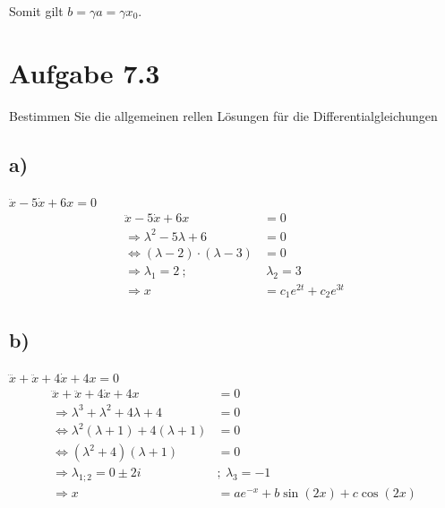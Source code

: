 \documentclass{theozettel}
\begin{document}
Somit gilt $b = \gamma a = \gamma x_0$.



\section*{Aufgabe 7.3} 
Bestimmen Sie die allgemeinen rellen Lösungen für die Differentialgleichungen
\subsection*{a)} $\ddot{x}-5\dot{x}+6x=0$
\begin{align*}
\ddot{x}-5\dot{x}+6x&=0\\
\Rightarrow\lambda^2-5\lambda+6&=0\\
\Leftrightarrow\left(\lambda-2\right)\cdot\left(\lambda-3\right)&=0\\
\Rightarrow\lambda_1=2 \ ;& \ \lambda_2=3\\
\Rightarrow x&=c_1e^{2t}+c_2e^{3t}
\end{align*}
\subsection*{b)}$\dddot{x}+\ddot{x}+4\dot{x}+4x=0$
\begin{align*}
\dddot{x}+\ddot{x}+4\dot{x}+4x&=0\\
\Rightarrow \lambda^3+\lambda^2+4\lambda+4&=0\\
\Leftrightarrow \lambda^2\left(\lambda+1\right)+4\left(\lambda+1\right)&=0\\
\Leftrightarrow\left(\lambda^2+4\right)\left(\lambda+1\right)&=0\\
\Rightarrow \lambda_{1;2}=0\pm 2i \ &; \ \lambda_3=-1\\
\Rightarrow x&=ae^{-x}+b\sin\left(2x\right)+c\cos\left(2x\right)
\end{align*}
\end{document}

